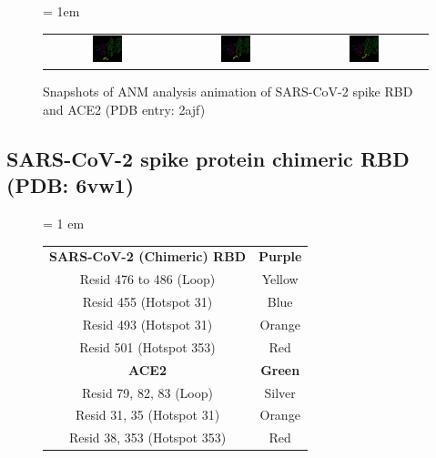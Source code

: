 \begin{figure}[h]
	\centering
	\tabcolsep = 1em
	\mySfFamily
	\begin{tabular}{c c c}
		\includegraphics[width = 0.25\textwidth]{../images/2ajf_animation1.png} & \includegraphics[width = 0.25\textwidth]{../images/2ajf_animation2.png} & \includegraphics[width = 0.25\textwidth]{../images/2ajf_animation3.png}
	\end{tabular}
	\caption{Snapshots of ANM analysis animation of SARS-CoV-2 spike RBD and ACE2 (PDB entry: 2ajf)}
	\label{fig:2ajf_animation}
\end{figure}

\FloatBarrier
{}
\subsection{SARS-CoV-2 spike protein chimeric RBD (PDB: 6vw1)}

\begin{figure}[h]
	\centering
	\tabcolsep = 1 em
	\mySfFamily
	\begin{tabular}{c c }
		\textbf{SARS-CoV-2 (Chimeric) RBD} & \textbf{Purple} \\
		Resid 476 to 486 (Loop)  & Yellow \\
		Resid 455 (Hotspot 31)  & Blue \\
		Resid 493 (Hotspot 31) & Orange \\
		Resid 501 (Hotspot 353) & Red \\
		\textbf{ACE2}  & \textbf{Green} \\
		Resid 79, 82, 83 (Loop) & Silver \\
		Resid 31, 35 (Hotspot 31) & Orange \\
		Resid 38, 353 (Hotspot 353) & Red \\
	\end{tabular}
	\caption{}
	\label{fig:6vw1_B&F_table}
\end{figure}

